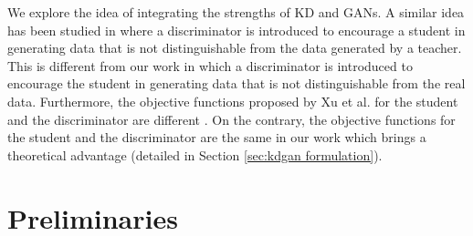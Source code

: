 \documentclass{article}
\begin{document}
We explore the idea of integrating the strengths of KD and GANs.
A similar idea has been studied in \cite{xu2017learning} where a discriminator is introduced to encourage a student in generating data that is not distinguishable from the data generated by a teacher.
This is different from our work in which a discriminator is introduced to encourage the student in generating data that is not distinguishable from the real data.
Furthermore, the objective functions proposed by Xu et al. for the student and the discriminator are different \cite{xu2017learning}.
On the contrary, the objective functions for the student and the discriminator are the same in our work which brings a theoretical advantage (detailed in Section \ref{sec:kdgan formulation}).


\section{Preliminaries}
\end{document}
